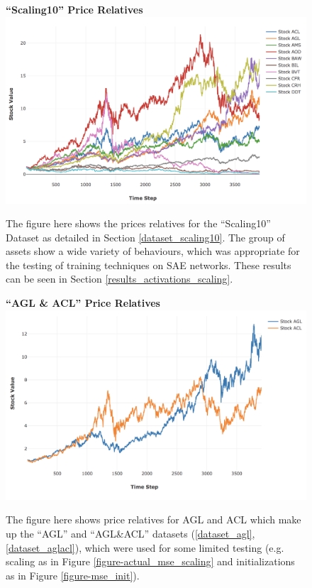 \documentclass[a4paper,11pt,oneside]{article}
\theoremstyle{plain}
\theoremstyle{definition}
\begin{document}
	\begin{figure}[H]
		\centering
		\textbf{``Scaling10'' Price Relatives}
		\includegraphics[scale=0.45]{images/results/prices/scaling10_prices.png} 
		\caption[``Scaling10'' Price Relatives]{The figure here shows the prices relatives for the ``Scaling10'' Dataset as detailed in Section \ref{dataset_scaling10}. The group of assets show a wide variety of behaviours, which was appropriate for the testing of training techniques on SAE networks. These results can be seen in Section \ref{results_activations_scaling}.}
		\label{figure-scaling10_prices}
	\end{figure}
	
	\begin{figure}[H]
		\centering
		\textbf{``AGL \& ACL'' Price Relatives}
		\includegraphics[scale=0.45]{images/results/prices/aglacl_prices.png} 
		\caption[``AGL\&ACL'' Price Relatives]{The figure here shows price relatives for AGL and ACL which make up the ``AGL'' and ``AGL\&ACL'' datasets (\ref{dataset_agl}, \ref{dataset_aglacl}), which were used for some limited testing (e.g. scaling as in Figure \ref{figure-actual_mse_scaling} and initializations as in Figure \ref{figure-mse_init}).}
		\label{figure-aglacl_prices}
	\end{figure}
	
\end{document}
